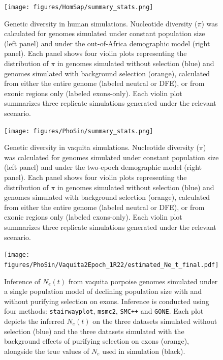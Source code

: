 \documentclass[hidelinks]{article}
\newcommand{\msmc}{\texttt{msmc2}\xspace}
\newcommand{\stairway}{\texttt{stairwayplot}\xspace}
\newcommand{\gone}{\texttt{GONE}\xspace}
\newcommand{\smcpp}{\texttt{SMC++}\xspace}
\begin{document}
\begin{figure}[h]
    \centering
    \texttt{[image: figures/HomSap/summary\_stats.png]}
    \caption{
    \label{fig:homsap-summary-stats}
    Genetic diversity in human simulations.
    Nucleotide diversity ($\pi$) was calculated for genomes simulated
    under constant population size (left panel) and under the out-of-Africa demographic model (right panel).
    Each panel shows four violin plots representing the distribution of $\pi$
    in genomes simulated without selection (blue) and genomes simulated with background selection (orange),
    calculated from either the entire genome (labeled neutral or DFE),
    or from exonic regions only (labeled exons-only).
    Each violin plot summarizes three replicate simulations generated under the relevant scenario.
    }
\end{figure}

\begin{figure}[h]
    \centering
    \texttt{[image: figures/PhoSin/summary\_stats.png]}
    \caption{
    \label{fig:vaquita-summary-stats}
    Genetic diversity in vaquita simulations.
    Nucleotide diversity ($\pi$) was calculated for genomes simulated
    under constant population size (left panel) and under the two-epoch demographic model (right panel).
    Each panel shows four violin plots representing the distribution of $\pi$
    in genomes simulated without selection (blue) and genomes simulated with background selection (orange),
    calculated from either the entire genome (labeled neutral or DFE),
    or from exonic regions only (labeled exons-only).
    Each violin plot summarizes three replicate simulations generated under the relevant scenario.
     }
\end{figure}

\begin{figure}[h]
    \centering
    \texttt{[image: figures/PhoSin/Vaquita2Epoch\_1R22/estimated\_Ne\_t\_final.pdf]}
    \caption{
    \label{fig:vaquita-demography}
    Inference of $N_e(t)$ from vaquita porpoise genomes simulated under a single population
    model of declining population size with and without purifying selection on exons.
    Inference is conducted using four methods: \stairway, \msmc, \smcpp and \gone.
    Each plot depicts the inferred $N_e(t)$ on the three datasets simulated without selection (blue)
    and the three datasets simulated with the background effects of purifying selection on exons (orange),
    alongside the true values of $N_e$ used in simulation (black).
}
\end{figure}
\end{document}
